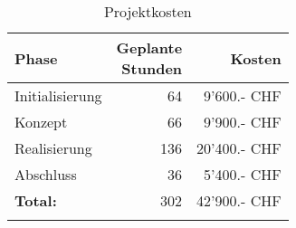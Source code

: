 \begin{longtable}[]{@{}lrr@{}}
  \toprule
  \textbf{Phase}  & \makecell[r]{\textbf{Geplante}                               \\\textbf{Stunden}} & \textbf{Kosten}\tabularnewline
  \midrule
  \endhead
  Initialisierung & 64                             & 9'600.- CHF\tabularnewline
  Konzept         & 66                             & 9'900.- CHF\tabularnewline
  Realisierung    & 136                            & 20'400.- CHF\tabularnewline
  Abschluss       & 36                             & 5'400.- CHF\tabularnewline
  \midrule
  \textbf{Total:} & 302                            & 42'900.- CHF\tabularnewline
  \bottomrule
  \caption{Projektkosten}
\end{longtable}

